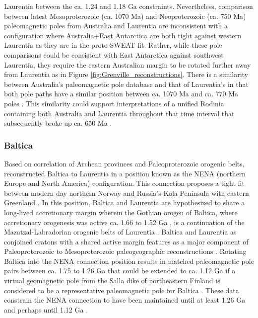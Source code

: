 \documentclass[twocolumn, switch]{article} %
\begin{document}
Laurentia between the ca. 1.24 and 1.18 Ga constraints. Nevertheless, comparison between latest Mesoproterozoic (ca. 1070 Ma) and Neoproterozoic (ca. 750 Ma) paleomagnetic poles from Australia and Laurentia are inconsistent with a configuration where Australia+East Antarctica are both tight against western Laurentia as they are in the proto-SWEAT fit. Rather, while these pole comparisons could be consistent with East Antarctica against southwest Laurentia, they require the eastern Australian margin to be rotated further away from Laurentia as in Figure \ref{fig:Grenville_reconstructions}. There is a similarity between Australia's paleomagnetic pole database and that of Laurentia's in that both pole paths have a similar position between ca. 1070 Ma and ca. 770 Ma poles \citep{Swanson-Hysell2012a}. This similarity could support interpretations of a unified Rodinia containing both Australia and Laurentia throughout that time interval \citep{Swanson-Hysell2012a} that subsequently broke up ca. 650 Ma \citep{Li2011a}.

\subsubsection{Baltica}

Based on correlation of Archean provinces and Paleoproterozoic orogenic belts, \cite{Gower1990a} reconstructed Baltica to Laurentia in a position known as the NENA (northern Europe and North America) configuration. This connection proposes a tight fit between modern-day northern Norway and Russia's Kola Peninsula with eastern Greenland \citep{Gower1990a, Salminen2021b}. In this position, Baltica and Laurentia are hypothesized to share a long-lived accretionary margin wherein the Gothian orogen of Baltica, where accretionary orogenesis was active ca. 1.66 to 1.52 Ga \citep{Bergstrom2020a}, is a continuation of the Mazatzal-Labradorian orogenic belts of Laurentia \citep{Karlstrom2001a}. Baltica and Laurentia as conjoined cratons with a shared active margin features as a major component of Paleoproterozoic to Mesoproterozoic paleogeographic reconstructions \citep{Evans2011a, Zhang2012a, Elming2021a}. Rotating Baltica into the NENA connection position results in matched paleomagnetic pole pairs between ca. 1.75 to 1.26 Ga \citep{Buchan2000a, Evans2008a} that could be extended to ca. 1.12 Ga if a virtual geomagnetic pole from the Salla dike of northeastern Finland is considered to be a representative paleomagnetic pole for Baltica \citep{Salminen2009b}. These data constrain the NENA connection to have been maintained until at least 1.26 Ga and perhaps until 1.12 Ga \citep{Salminen2021b}. 
\end{document}
